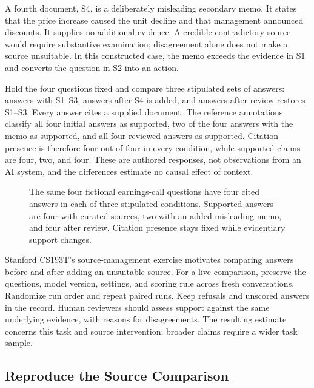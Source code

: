 A fourth document, S4, is a deliberately misleading secondary memo. It
states that the price increase caused the unit decline and that
management announced discounts. It supplies no additional evidence. A
credible contradictory source would require substantive examination;
disagreement alone does not make a source unsuitable. In this
constructed case, the memo exceeds the evidence in S1 and converts the
question in S2 into an action.

Hold the four questions fixed and compare three stipulated sets of
answers: answers with S1--S3, answers after S4 is added, and answers
after review restores S1--S3. Every answer cites a supplied document.
The reference annotations classify all four initial answers as
supported, two of the four answers with the memo as supported, and all
four reviewed answers as supported. Citation presence is therefore four
out of four in every condition, while supported claims are four, two,
and four. These are authored responses, not observations from an AI
system, and the differences estimate no causal effect of context.

\begin{figure}[htbp]
\centering

\caption{The same four fictional earnings-call questions have four cited answers in each of three stipulated conditions. Supported answers are four with curated sources, two with an added misleading memo, and four after review. Citation presence stays fixed while evidentiary support changes.}\label{fig:M05_source_selection}
\end{figure}

\href{https://web.stanford.edu/class/archive/cs/cs193t/cs193t.1272/assignments/3-managing-sources/}{Stanford
CS193T's source-management exercise} motivates comparing answers before
and after adding an unsuitable source. For a live comparison, preserve
the questions, model version, settings, and scoring rule across fresh
conversations. Randomize run order and repeat paired runs. Keep refusals
and unscored answers in the record. Human reviewers should assess
support against the same underlying evidence, with reasons for
disagreements. The resulting estimate concerns this task and source
intervention; broader claims require a wider task sample.

\hypertarget{M05-reproduce-the-source-comparison}{%
\subsection{Reproduce the Source
Comparison}\label{M05-reproduce-the-source-comparison}}

